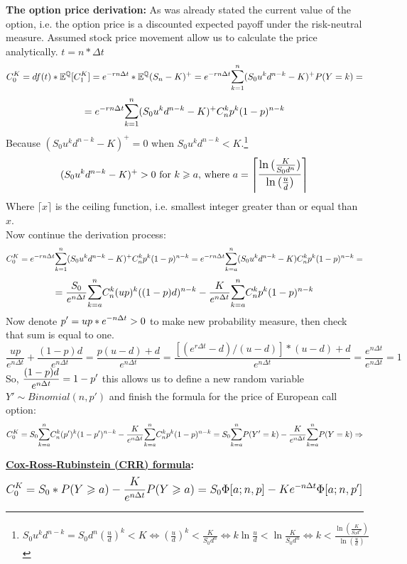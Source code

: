 \documentclass[11pt]{article}
\begin{document}
\textbf{The option price derivation:}
As was already stated the current value of the option, i.e. the option price is a discounted expected payoff under the risk-neutral measure. Assumed stock price movement allow us to calculate the price analytically. $t = n*\Delta{t}$
\[C_0^K = df(t) * \mathbb{E^Q}{[C_1^K]} =  e^{-rn\Delta{t}}*\mathbb{E^Q}{(S_n-K)^+} = e^{-rn\Delta{t}}\mathlarger{\sum}_{k=1}^{n} (S_0u^kd^{n-k} - K)^+P(Y=k) = \]
\[ = e^{-rn\Delta{t}}\mathlarger{\sum}_{k=1}^{n} (S_0u^kd^{n-k} - K)^+C_n^kp^k(1-p)^{n-k}\]
\newpage
Because $(S_0u^kd^{n-k}-K)^+ = 0$ when $S_0u^kd^{n-k} < K$.\footnote{$S_0u^kd^{n-k} = S_0d^n(\frac{u}{d})^k < K \Leftrightarrow (\frac{u}{d})^k < \frac{K}{S_0d^n} \Leftrightarrow 
k\ln{\frac{u}{d}} < \ln{\frac{K}{S_0d^n}} \Leftrightarrow  k < \frac{\ln{(\frac{K}{S_0d^n})}}{\ln{(\frac{u}{d})}}$}
\[
(S_0u^kd^{n-k}-K)^+ > 0 \text{ for $k \geqslant a$, where }  a = \left\lceil \mathlarger{\frac{\ln{(\frac{K}{S_0d^n})}}{\ln{(\frac{u}{d})}}} \right\rceil
\]
Where $\lceil x \rceil$ is the ceiling function, i.e. smallest integer greater than or equal than $x$.\\Now continue the derivation process:
\[C_0^K = e^{-rn\Delta{t}}\mathlarger{\sum}_{k=1}^{n} (S_0u^kd^{n-k} - K)^+C_n^kp^k(1-p)^{n-k} = e^{-rn\Delta{t}}\mathlarger{\sum}_{k=a}^{n} (S_0u^kd^{n-k} - K)C_n^kp^k(1-p)^{n-k} = \]
\[ = \frac{S_0}{e^{n\Delta{t}}}\mathlarger{\sum}_{k=a}^{n} C_n^k(up)^k((1-p)d)^{n-k} - \frac{K}{e^{n\Delta{t}}}\mathlarger{\sum}_{k=a}^{n} C_n^kp^k(1-p)^{n-k}\]
Now denote $\mathlarger{p' = up*e^{-n\Delta{t}} > 0}$ to make new probability measure, then check that sum is equal to one.
\[
\frac{up}{e^{n\Delta{t}}} + \frac{(1-p)d}{e^{n\Delta{t}}} = \frac{p(u-d) + d}{e^{n\Delta{t}}} =  \frac{[(e^{r\Delta{t}} - d)/(u - d)]*(u-d) + d}{e^{n\Delta{t}}} = \frac{e^{n\Delta{t}}}{e^{n\Delta{t}}} = 1
\]
So, $\mathlarger{\frac{(1-p)d}{e^{n\Delta{t}}} = 1 - p'}$ this allows us to define a new random variable $Y' \sim Binomial(n,p')$ and finish the formula for the price of European call option:
\[
C_0^K = S_0\mathlarger{\sum}_{k=a}^{n} C_n^k(p')^k(1-p')^{n-k} - \frac{K}{e^{n\Delta{t}}}\mathlarger{\sum}_{k=a}^{n} C_n^kp^k(1-p)^{n-k}=
S_0\mathlarger{\sum}_{k=a}^{n} P(Y' = k) - \frac{K}{e^{n\Delta{t}}}\mathlarger{\sum}_{k=a}^{n} P(Y = k) \Rightarrow
\]

\textbf{\underline{Cox-Ross-Rubinstein (CRR) formula}:} \cite{C_R_R_79}
\begin{equation}
\label{eqn:CRR}
\mathlarger{C_0^K = S_0*P(Y \geqslant a) - \frac{K}{e^{n\Delta{t}}}P(Y \geqslant a) = S_0\Phi[a;n,p] - Ke^{-n\Delta{t}}\Phi[a;n,p']}
\end{equation}
\end{document}
